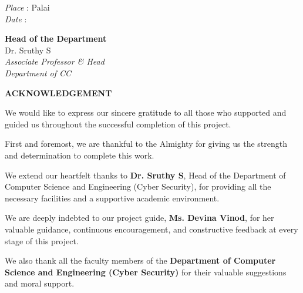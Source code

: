 \documentclass[12pt,oneside,a4paper]{book}
\begin{document}
\begin{flushleft}
\begin{minipage}{0.45\textwidth}
  \vspace{1.2cm}
  \textit{Place} : Palai\\
  \textit{Date} :
\end{minipage}  
\hfill
\begin{minipage}{0.45\textwidth}  
    \textbf{Head of the Department}\\
    Dr. Sruthy S\\
    \textit{Associate Professor \& Head}\\
    \textit{Department of CC}
\end{minipage}
\end{flushleft}

\vspace{1cm}


\newpage
\thispagestyle{empty}
\begin{center}
    \textbf{\Large ACKNOWLEDGEMENT}
\end{center}
\vspace*{1cm}

\noindent
We would like to express our sincere gratitude to all those who supported and guided us throughout the successful completion of this project.  

\vspace*{0.5cm}\noindent
First and foremost, we are thankful to the Almighty for giving us the strength and determination to complete this work.  

\vspace*{0.5cm}\noindent
We extend our heartfelt thanks to \textbf{Dr. Sruthy S}, Head of the Department of Computer Science and Engineering (Cyber Security), for providing all the necessary facilities and a supportive academic environment.

\vspace*{0.5cm}\noindent
We are deeply indebted to our project guide, \textbf{Ms. Devina Vinod}, for her valuable guidance, continuous encouragement, and constructive feedback at every stage of this project.  

\vspace*{0.5cm}\noindent
We also thank all the faculty members of the \textbf{Department of Computer Science and Engineering (Cyber Security)} for their valuable suggestions and moral support.  
\end{document}

